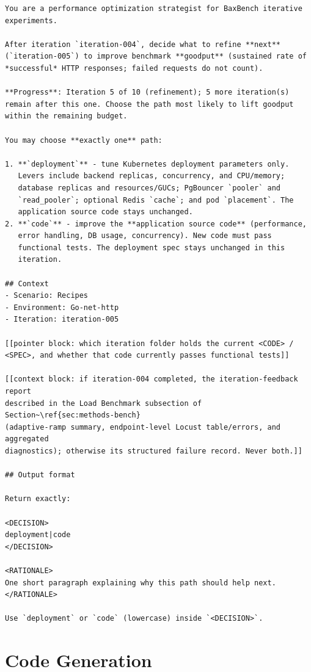 \small
\begin{verbatim}
You are a performance optimization strategist for BaxBench iterative
experiments.

After iteration `iteration-004`, decide what to refine **next**
(`iteration-005`) to improve benchmark **goodput** (sustained rate of
*successful* HTTP responses; failed requests do not count).

**Progress**: Iteration 5 of 10 (refinement); 5 more iteration(s)
remain after this one. Choose the path most likely to lift goodput
within the remaining budget.

You may choose **exactly one** path:

1. **`deployment`** - tune Kubernetes deployment parameters only.
   Levers include backend replicas, concurrency, and CPU/memory;
   database replicas and resources/GUCs; PgBouncer `pooler` and
   `read_pooler`; optional Redis `cache`; and pod `placement`. The
   application source code stays unchanged.
2. **`code`** - improve the **application source code** (performance,
   error handling, DB usage, concurrency). New code must pass
   functional tests. The deployment spec stays unchanged in this
   iteration.

## Context
- Scenario: Recipes
- Environment: Go-net-http
- Iteration: iteration-005

[[pointer block: which iteration folder holds the current <CODE> /
<SPEC>, and whether that code currently passes functional tests]]

[[context block: if iteration-004 completed, the iteration-feedback report
described in the Load Benchmark subsection of Section~\ref{sec:methods-bench}
(adaptive-ramp summary, endpoint-level Locust table/errors, and aggregated
diagnostics); otherwise its structured failure record. Never both.]]

## Output format

Return exactly:

<DECISION>
deployment|code
</DECISION>

<RATIONALE>
One short paragraph explaining why this path should help next.
</RATIONALE>

Use `deployment` or `code` (lowercase) inside `<DECISION>`.
\end{verbatim}
\normalsize


\section{Code Generation}
\label{sec:appendix-prompts-code}

